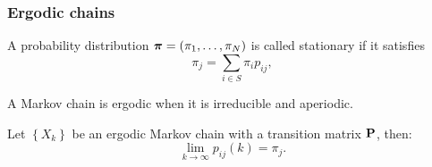\begin{frame}
	\frametitle{Ergodic chains}
	\begin{definition}[Stationarity]
		A probability distribution $\boldsymbol{\pi} = (\pi_1, \ldots, \pi_N)$ is called stationary if it satisfies
		\begin{equation*}
		\pi_j = \sum_{i \in S} \pi_i p_{ij},
		\end{equation*}
	\end{definition}
	\begin{definition}[Ergodicity]
		A Markov chain is ergodic when it is irreducible and aperiodic.
	\end{definition}
	\begin{theorem}
		Let $\left\{X_k\right\}$ be an ergodic Markov chain with a transition matrix $\mathbf{P}$, then:
		\begin{equation*}
		\lim_{k \rightarrow \infty} p_{ij}(k) = \pi_j.
		\end{equation*}
	\end{theorem}
\end{frame}